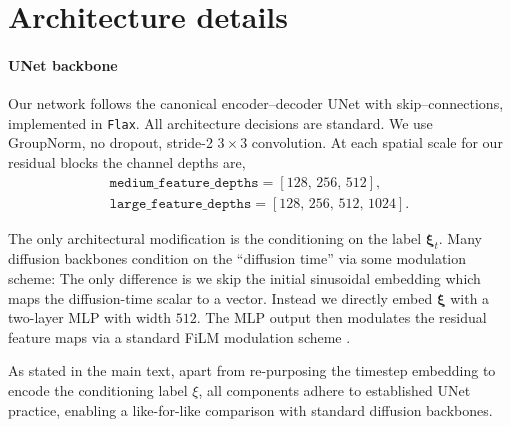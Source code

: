 \documentclass{article}
\theoremstyle{plain}
\theoremstyle{definition}
\theoremstyle{remark}
\newcommand{\bfxi}{{\bm \xi}}
\begin{document}
\section{Architecture details}
\label{appx:architecture}
\paragraph{UNet backbone}
Our network follows the canonical encoder–decoder UNet with skip–connections,
implemented in \texttt{Flax}. All architecture decisions are standard. We use GroupNorm, no dropout,  stride-2 $3{\times}3$ convolution. At each spatial scale for our residual blocks the channel depths are,
\begin{align*}
  \texttt{medium\_feature\_depths}  =[128,\,256,\,512],\qquad \\
  \texttt{large\_feature\_depths}=[128,\,256,\,512,\,1024].
\end{align*}

The only architectural modification is the conditioning on the label $\bfxi_t$. Many diffusion backbones condition on the ``diffusion time'' via some modulation scheme: The only difference is we skip the initial sinusoidal embedding which maps the diffusion-time scalar to a vector. Instead we directly embed $\bfxi$ with a two-layer MLP with width $512$. The MLP output then modulates the residual feature maps via a standard FiLM modulation scheme \cite{perez2018film}.

As stated in the main text, apart from re-purposing the timestep embedding to encode the conditioning label $\xi$, all components adhere to established UNet practice, enabling a
like-for-like comparison with standard diffusion backbones.
\end{document}
